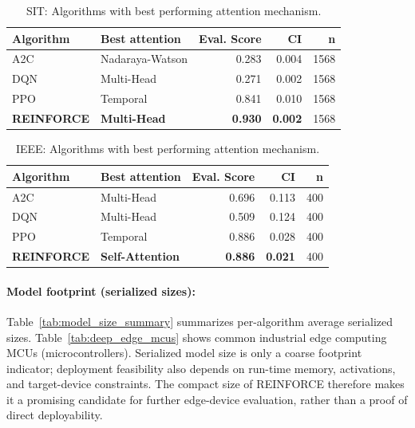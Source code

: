 \documentclass[sn-vancouver-num]{sn-jnl}%
\begin{document}
\begin{table}
	\caption{SIT: Algorithms with best performing attention mechanism.}
	\label{tab:sit_best_attn}
	\begin{tabular}{l l r r r}
	\toprule
	\textbf{Algorithm} & \textbf{Best attention} & \textbf{Eval. Score} & \textbf{CI} & \textbf{n}\\
	\midrule
		A2C & Nadaraya-Watson & 0.283 & 0.004 & 1568 \\
		DQN & Multi-Head & 0.271 & 0.002 & 1568 \\
		PPO & Temporal & 0.841 & 0.010 & 1568 \\
		\textbf{REINFORCE} & \textbf{Multi-Head} & \textbf{0.930} & \textbf{0.002} & 1568 \\
	\bottomrule
	\end{tabular}
\end{table}

\begin{table}[htbp]
	\centering
	\caption{IEEE: Algorithms with best performing attention mechanism.}
	\label{tab:ieee_best_attn}
	\begin{tabular}{l l r r r}
	\toprule
	\textbf{Algorithm} & \textbf{Best attention} & \textbf{Eval. Score} & \textbf{CI} & \textbf{n}\\
	\midrule
		A2C & Multi-Head & 0.696 & 0.113 & 400 \\
		DQN & Multi-Head & 0.509 & 0.124 & 400 \\
		PPO & Temporal & 0.886 & 0.028 & 400 \\
		\textbf{REINFORCE} & \textbf{Self-Attention} & \textbf{0.886} & \textbf{0.021} & 400 \\
	\bottomrule
	\end{tabular}
\end{table}

\paragraph{Model footprint (serialized sizes):} 
Table~\ref{tab:model_size_summary} summarizes per-algorithm average serialized sizes. Table~\ref{tab:deep_edge_mcus} shows common industrial edge computing MCUs (microcontrollers). Serialized model size is only a coarse footprint indicator; deployment feasibility also depends on run-time memory, activations, and target-device constraints. The compact size of \textsc{REINFORCE} therefore makes it a promising candidate for further edge-device evaluation, rather than a proof of direct deployability.
\end{document}
